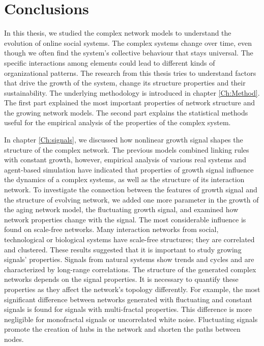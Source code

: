 \chapter{Conclusions} %
\label{Ch:Conclussion}

In this thesis, we studied the complex network models to understand the evolution of online social systems. %
The complex systems change over time, even though we often find the system's collective behaviour that stays universal. The specific interactions among elements could lead to different kinds of organizational patterns. The research from this thesis tries to understand factors that drive the growth of the system, change its structure properties and their sustainability.
The underlying methodology is introduced in chapter \ref{Ch:Method}. The first part explained the most important properties of network structure and the growing network models. The second part explains the statistical methods useful for the empirical analysis of the properties of the complex system.  

In chapter \ref{Ch:signals}, we discussed how nonlinear growth signal shapes the structure of the complex network. 
The previous models combined linking rules with constant growth, however, empirical analysis of various real systems and agent-based simulation \cite{mitrovic2012, mitrovic2015} have indicated that properties of growth signal influence the dynamics of a complex systems, as well as the structure of its interaction network. To investigate the connection between the features of growth signal and the structure of evolving network, we added one more parameter in the growth of the aging network model, the fluctuating growth signal, and examined how network properties change with the signal.
The most considerable influence is found on scale-free networks. Many interaction networks from social, technological or biological systems have scale-free structures; they are correlated and clustered. These results suggested that it is important to study growing signals' properties. Signals from natural systems show trends and cycles and are characterized by long-range correlations. The structure of the generated complex networks depends on the signal properties. It is necessary to quantify these properties as they affect the network's topology differently. For example, the most significant difference between networks generated with fluctuating and constant signals is found for signals with multi-fractal properties. This difference is more negligible for monofractal signals or uncorrelated white noise. Fluctuating signals promote the creation of hubs in the network and shorten the paths between nodes.

